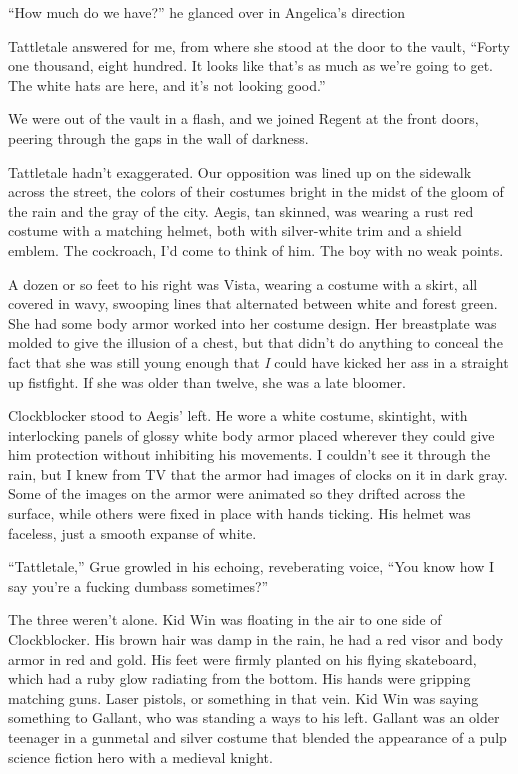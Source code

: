 ``How much do we have?'' he glanced over in Angelica's direction



Tattletale answered for me, from where she stood at the door to the vault, ``Forty one thousand, eight hundred. It looks like that's as much as we're going to get. The white hats are here, and it's not looking good.''



We were out of the vault in a flash, and we joined Regent at the front doors, peering through the gaps in the wall of darkness.



Tattletale hadn't exaggerated. Our opposition was lined up on the sidewalk across the street, the colors of their costumes bright in the midst of the gloom of the rain and the gray of the city.  Aegis, tan skinned, was wearing a rust red costume with a matching helmet, both with silver-white trim and a shield emblem. The cockroach, I'd come to think of him.  The boy with no weak points.



A dozen or so feet to his right was Vista, wearing a costume with a skirt, all covered in wavy, swooping lines that alternated between white and forest green. She had some body armor worked into her costume design.  Her breastplate was molded to give the illusion of a chest, but that didn't do anything to conceal the fact that she was still young enough that \emph{I} could have kicked her ass in a straight up fistfight.  If she was older than twelve, she was a late bloomer.



Clockblocker stood to Aegis' left. He wore a white costume, skintight, with interlocking panels of glossy white body armor placed wherever they could give him protection without inhibiting his movements. I couldn't see it through the rain, but I knew from TV that the armor had images of clocks on it in dark gray.  Some of the images on the armor were animated so they drifted across the surface, while others were fixed in place with hands ticking. His helmet was faceless, just a smooth expanse of white.



``Tattletale,'' Grue growled in his echoing, reveberating voice, ``You know how I say you're a fucking dumbass sometimes?''



The three weren't alone. Kid Win was floating in the air to one side of Clockblocker. His brown hair was damp in the rain, he had a red visor and body armor in red and gold. His feet were firmly planted on his flying skateboard, which had a ruby glow radiating from the bottom.  His hands were gripping matching guns.  Laser pistols, or something in that vein.  Kid Win was saying something to Gallant, who was standing a ways to his left.  Gallant was an older teenager in a gunmetal and silver costume that blended the appearance of a pulp science fiction hero with a medieval knight.



